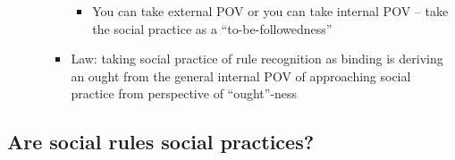 \begin{itemize}
\begin{itemize}
\begin{itemize}
      \begin{itemize}
      \tightlist
      \item
        You can take external POV or you can take internal POV -- take
        the social practice as a ``to-be-followedness''
      \end{itemize}
    \item
      Law: taking social practice of rule recognition as binding is
      deriving an ought from the general internal POV of approaching
      social practice from perspective of ``ought''-ness
    \end{itemize}
  \end{itemize}
\end{itemize}

\hypertarget{are-social-rules-social-practices}{%
\subsection{Are social rules social
practices?}\label{are-social-rules-social-practices}}

